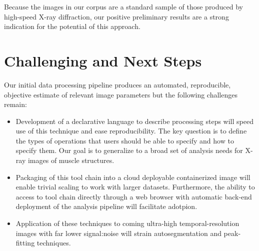 \documentclass{sig-alternate}
\begin{document}
Because the images in our corpus are a standard sample of those
produced by high-speed X-ray diffraction, our positive preliminary
results are a strong indication for the potential of this approach.

\section{Challenging and Next Steps}
\label{sec:challenges}

Our initial data processing pipeline produces an automated,
reproducible, objective estimate of relevant image parameters but the
following challenges remain:

\begin{itemize}[noitemsep]
\item Development of a declarative language to describe processing steps will speed use of this technique and ease reproducibility. 
The key question is to define the types of operations that users should be able to specify and how to specify them. Our goal is
to generalize to a broad set of analysis needs for X-ray images of muscle structures.
\item Packaging of this tool chain into a cloud deployable
containerized image will enable trivial scaling to work with larger
datasets. Furthermore, the ability to access to tool chain directly through a web browser 
with automatic back-end deployment of the analysis pipeline will facilitate adotpion. 
\item Application of these techniques to coming ultra-high temporal-resolution images with far lower signal:noise will strain autosegmentation and peak-fitting techniques. 
\end{itemize}


%
%


\scriptsize


\end{document}
